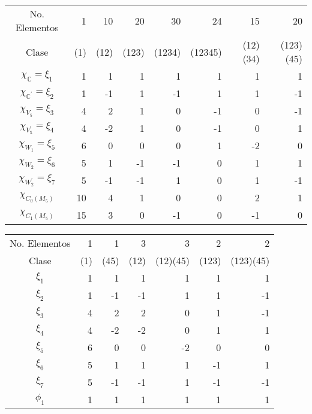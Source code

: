 \documentclass[12pt]{book}
\theoremstyle{definition}
\newcounter{in}
\begin{document}
{\begin{center}
\begin{small}
\begin{tabular}{c |r r r r r r r}
  No. Elementos& 1 & 10 & 20 & 30 & 24 & 15 & 20  \\
  Clase & (1) & (12) & (123) & (1234) & (12345) & (12)(34) & (123)(45) \\
    \hline
  $\chi_{\mathbb{C}}=\xi_{1}$ & 1 & 1 & 1 & 1 & 1 & 1 & 1 \\
  $\chi_{\mathbb{C}^{'}}=\xi_{2}$ & 1 & -1 & 1 & -1 & 1 & 1 & -1\\
  $\chi_{V_{5}}=\xi_{3}$ & 4 & 2 & 1 & 0 & -1 & 0 & -1\\
  $\chi_{V_{5}^{'}}=\xi_{4}$ & 4 & -2 & 1 & 0 & -1 & 0 & 1 \\
  $\chi_{W_{1}}=\xi_{5}$ & 6 & 0 & 0 & 0 & 1 & -2 & 0 \\
  $\chi_{W_{2}}=\xi_{6}$ & 5 & 1 & -1 & -1 & 0 & 1 & 1 \\
  $\chi_{W_{2}^{'}}=\xi_{7}$ & 5 & -1 & -1 & 1 & 0 & 1 & -1 \\
  \hline
  $\chi_{C_{0}(M_{5})}$ & 10 & 4 & 1 & 0 & 0 & 2 & 1 \\
  $\chi_{C_{1}(M_{5})}$ & 15 & 3 & 0 & -1 & 0 & -1 & 0
\end{tabular}
\end{small}
\end{center}

\bigskip

\begin{tabular}{c |r r r r r r}
  No. Elementos& 1 & 1 & 3 & 3 & 2 & 2 \\
  Clase & (1) & (45) & (12) & (12)(45) & (123) & (123)(45) \\
    \hline
  $\xi_{1}$ & 1 & 1 & 1 & 1 & 1 & 1 \\
  $\xi_{2}$ & 1 & -1 & -1 & 1 & 1 & -1 \\
  $\xi_{3}$ & 4 & 2 & 2 & 0 & 1 & -1 \\
  $\xi_{4}$ & 4 & -2 & -2 & 0 & 1 & 1 \\
  $\xi_{5}$ & 6 & 0 & 0 & -2 & 0 & 0 \\
  $\xi_{6}$ & 5 & 1 & 1 & 1 & -1 & 1 \\
  $\xi_{7}$ & 5 & -1 & -1 & 1 & -1 & -1 \\
  \hline
  $\phi_{1}$ & 1 & 1 & 1 & 1 & 1 & 1 \\
\end{tabular}

\bigskip

}
\end{document}
